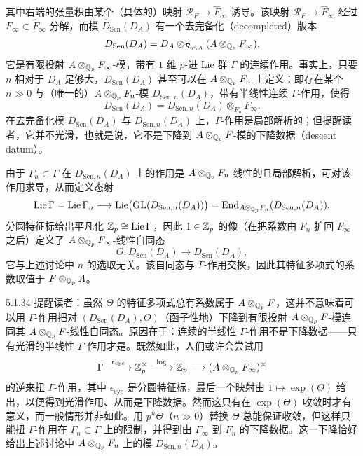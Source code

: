 其中右端的张量积由某个（具体的）映射 $\mathcal{R}_F\to\widehat{F}_\infty$ 诱导。该映射 $\mathcal{R}_F\to\widehat{F}_\infty$ 经过 $F_\infty\subset\widehat{F}_\infty$ 分解，而模 $\widehat{D}_{\mathrm{Sen}}(D_A)$ 有一个去完备化（decompleted）版本
\[
D_{\mathrm{Sen}}(D_A)=D_A\otimes_{\mathcal{R}_{F,A}}(A\otimes_{\mathbb{Q}_p}F_\infty),
\]
它是有限投射 $A\otimes_{\mathbb{Q}_p}F_\infty$-模，带有 $1$ 维 $p$-进 Lie 群 $\Gamma$ 的连续作用。事实上，只要 $n$ 相对于 $D_A$ 足够大，$D_{\mathrm{Sen}}(D_A)$ 甚至可以在 $A\otimes_{\mathbb{Q}_p}F_n$ 上定义：即存在某个 $n\gg0$ 与（唯一的）$A\otimes_{\mathbb{Q}_p}F_n$-模 $D_{\mathrm{Sen},n}(D_A)$，带有半线性连续 $\Gamma$-作用，使得
\[
D_{\mathrm{Sen}}(D_A)=D_{\mathrm{Sen},n}(D_A)\otimes_{F_n}F_\infty.
\]
在去完备化模 $D_{\mathrm{Sen}}(D_A)$ 与 $D_{\mathrm{Sen},n}(D_A)$ 上，$\Gamma$-作用是局部解析的；但提醒读者，它并不光滑，也就是说，它不是下降到 $A\otimes_{\mathbb{Q}_p}F$-模的下降数据（descent datum）。

由于 $\Gamma_n\subset\Gamma$ 在 $D_{\mathrm{Sen},n}(D_A)$ 上的作用是 $A\otimes_{\mathbb{Q}_p}F_n$-线性的且局部解析，可对该作用求导，从而定义态射
\[
\operatorname{Lie}\Gamma=\operatorname{Lie}\Gamma_n\longrightarrow\operatorname{Lie}\bigl(\mathrm{GL}(D_{\mathrm{Sen},n}(D_A))\bigr)=\operatorname{End}_{A\otimes_{\mathbb{Q}_p}F_n}(D_{\mathrm{Sen},n}(D_A)).
\]
分圆特征标给出平凡化 $\mathbb{Z}_p\cong\operatorname{Lie}\Gamma$，因此 $1\in\mathbb{Z}_p$ 的像（在把系数由 $F_n$ 扩回 $F_\infty$ 之后）定义了 $A\otimes_{\mathbb{Q}_p}F_\infty$-线性自同态
\[
\Theta: D_{\mathrm{Sen}}(D_A)\longrightarrow D_{\mathrm{Sen}}(D_A),
\]
它与上述讨论中 $n$ 的选取无关。该自同态与 $\Gamma$-作用交换，因此其特征多项式的系数取值于 $F\otimes_{\mathbb{Q}_p}A$。

\begin{rem}{5.1.34}
提醒读者：虽然 $\Theta$ 的特征多项式总有系数属于 $A\otimes_{\mathbb{Q}_p}F$，这并不意味着可以用 $\Gamma$-作用把对 $(D_{\mathrm{Sen}}(D_A),\Theta)$（函子性地）下降到有限投射 $A\otimes_{\mathbb{Q}_p}F$-模连同其 $A\otimes_{\mathbb{Q}_p}F$-线性自同态。原因在于：连续的半线性 $\Gamma$-作用不是下降数据——只有光滑的半线性 $\Gamma$-作用才是。既然如此，人们或许会尝试用
\[
\Gamma\xrightarrow{\ \epsilon_{\mathrm{cyc}}\ }\Z_p^\times\xrightarrow{\ \log\ }\Z_p\longrightarrow(A\otimes_{\Q_p}F_\infty)^\times
\]
的逆来扭 $\Gamma$-作用，其中 $\epsilon_{\mathrm{cyc}}$ 是分圆特征标，最后一个映射由 $1\mapsto\exp(\Theta)$ 给出，以便得到光滑作用、从而是下降数据。然而这只有在 $\exp(\Theta)$ 收敛时才有意义，而一般情形并非如此。用 $p^n\Theta$（$n\gg0$）替换 $\Theta$ 总能保证收敛，但这样只能扭 $\Gamma$-作用在 $\Gamma_n\subset\Gamma$ 上的限制，并得到由 $F_\infty$ 到 $F_n$ 的下降数据。这一下降恰好给出上述讨论中 $A\otimes_{\mathbb{Q}_p}F_n$ 上的模 $D_{\mathrm{Sen},n}(D_A)$。
\label{thm:a4-5-1-34}
\end{rem}

